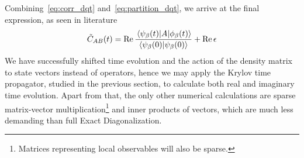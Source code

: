 Combining~\eqref{eq:corr_dqt} and~\eqref{eq:partition_dqt}, we arrive at the final expression, as seen in literature~\autocite{Steinigeweg2014,Steinigeweg2015,Richter2019}
\begin{equation}
	\tilde{C}_{AB}(t) = \Re \frac{\matrixel{\psi_{\beta}(t)}{A}{\phi_{\beta}(t)}}{\braket{\psi_{\beta}(0)}{\psi_{\beta}(0)}} + \Re \epsilon
	\label{eq:corr_dqt_final}
\end{equation}
We have successfully shifted time evolution and the action of the density matrix to state vectors instead of operators,
hence we may apply the Krylov time propagator, studied in the previous section, to calculate both real and imaginary time
evolution. Apart from that, the only other numerical calculations are sparse matrix-vector multiplication\footnote{Matrices representing local observables will also be sparse.}
and inner products of vectors, which are much less demanding than full Exact Diagonalization.

